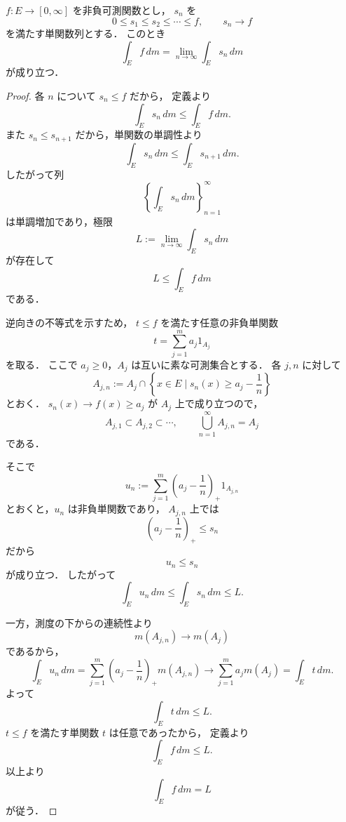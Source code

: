 \begin{theorem}[非負可測関数の積分は単関数近似の極限]
$f:E \to [0,\infty]$ を非負可測関数とし，
$s_n$ を
\[
0 \le s_1 \le s_2 \le \cdots \le f,
\qquad
s_n \to f
\]
を満たす単関数列とする．
このとき
\[
\int_E f\,dm
=
\lim_{n\to\infty}\int_E s_n\,dm
\]
が成り立つ．
\end{theorem}
\begin{proof}
各 $n$ について $s_n \le f$ だから，
定義より
\[
\int_E s_n\,dm \le \int_E f\,dm.
\]
また $s_n \le s_{n+1}$ だから，単関数の単調性より
\[
\int_E s_n\,dm \le \int_E s_{n+1}\,dm.
\]
したがって列
\[
\left\{\int_E s_n\,dm\right\}_{n=1}^{\infty}
\]
は単調増加であり，極限
\[
L:=\lim_{n\to\infty}\int_E s_n\,dm
\]
が存在して
\[
L \le \int_E f\,dm
\]
である．

逆向きの不等式を示すため，
$t \le f$ を満たす任意の非負単関数
\[
t=\sum_{j=1}^m a_j 1_{A_j}
\]
を取る．
ここで $a_j \ge 0$，$A_j$ は互いに素な可測集合とする．
各 $j,n$ に対して
\[
A_{j,n}:=A_j \cap \left\{x \in E \mid s_n(x)\ge a_j-\frac1n\right\}
\]
とおく．
$s_n(x)\to f(x)\ge a_j$ が $A_j$ 上で成り立つので，
\[
A_{j,1}\subset A_{j,2}\subset \cdots,
\qquad
\bigcup_{n=1}^{\infty}A_{j,n}=A_j
\]
である．

そこで
\[
u_n:=\sum_{j=1}^m \left(a_j-\frac1n\right)_+ 1_{A_{j,n}}
\]
とおくと，$u_n$ は非負単関数であり，
$A_{j,n}$ 上では
\[
\left(a_j-\frac1n\right)_+ \le s_n
\]
だから
\[
u_n \le s_n
\]
が成り立つ．
したがって
\[
\int_E u_n\,dm \le \int_E s_n\,dm \le L.
\]

一方，測度の下からの連続性より
\[
m(A_{j,n}) \to m(A_j)
\]
であるから，
\[
\int_E u_n\,dm
=
\sum_{j=1}^m \left(a_j-\frac1n\right)_+ m(A_{j,n})
\to
\sum_{j=1}^m a_j m(A_j)
=
\int_E t\,dm.
\]
よって
\[
\int_E t\,dm \le L.
\]
$t \le f$ を満たす単関数 $t$ は任意であったから，
定義より
\[
\int_E f\,dm \le L.
\]
以上より
\[
\int_E f\,dm=L
\]
が従う．
\end{proof}

